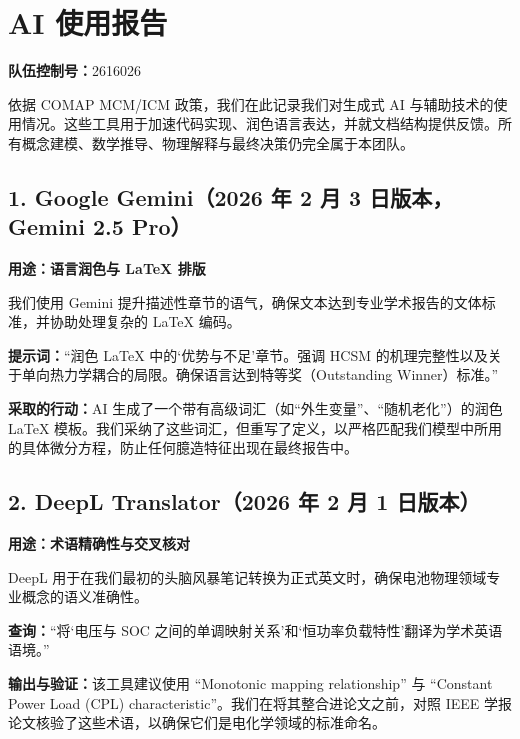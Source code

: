 \documentclass[11pt,a4paper]{ctexart}
\begin{document}
\section*{AI 使用报告}

\noindent\textbf{队伍控制号：}2616026

依据 COMAP MCM/ICM 政策，我们在此记录我们对生成式 AI 与辅助技术的使用情况。这些工具用于加速代码实现、润色语言表达，并就文档结构提供反馈。所有概念建模、数学推导、物理解释与最终决策仍完全属于本团队。

\subsection*{1. Google Gemini（2026 年 2 月 3 日版本，Gemini 2.5 Pro）}

\noindent\textbf{用途：语言润色与 LaTeX 排版}

我们使用 Gemini 提升描述性章节的语气，确保文本达到专业学术报告的文体标准，并协助处理复杂的 LaTeX 编码。

\noindent\textbf{提示词：}“润色 LaTeX 中的‘优势与不足’章节。强调 HCSM 的机理完整性以及关于单向热力学耦合的局限。确保语言达到特等奖（Outstanding Winner）标准。”

\noindent\textbf{采取的行动：}AI 生成了一个带有高级词汇（如“外生变量”、“随机老化”）的润色 LaTeX 模板。我们采纳了这些词汇，但重写了定义，以严格匹配我们模型中所用的具体微分方程，防止任何臆造特征出现在最终报告中。

\subsection*{2. DeepL Translator（2026 年 2 月 1 日版本）}

\noindent\textbf{用途：术语精确性与交叉核对}

DeepL 用于在我们最初的头脑风暴笔记转换为正式英文时，确保电池物理领域专业概念的语义准确性。

\noindent\textbf{查询：}“将‘电压与 SOC 之间的单调映射关系’和‘恒功率负载特性’翻译为学术英语语境。”

\noindent\textbf{输出与验证：}该工具建议使用 “Monotonic mapping relationship” 与 “Constant Power Load (CPL) characteristic”。我们在将其整合进论文之前，对照 IEEE 学报论文核验了这些术语，以确保它们是电化学领域的标准命名。
\end{document}
